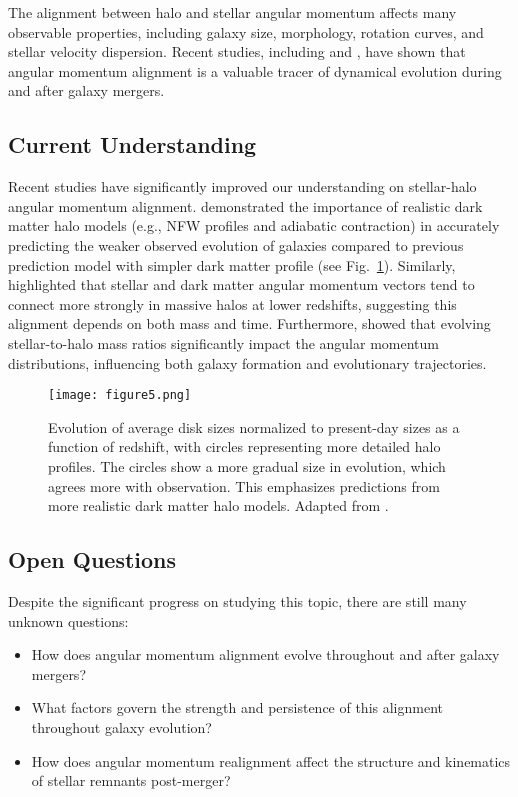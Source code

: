 \documentclass[twocolumn]{aastex631}
\begin{document}
The alignment between halo and stellar angular momentum affects many observable properties, including galaxy size, morphology, rotation curves, and stellar velocity dispersion. Recent studies, including \citet{Chua2019} and \citet{Baptista2023}, have shown that angular momentum alignment is a valuable tracer of dynamical evolution during and after galaxy mergers.

\subsection{Current Understanding}
Recent studies have significantly improved our understanding on stellar-halo angular momentum alignment. \cite{Somerville2008} demonstrated the importance of realistic dark matter halo models (e.g., NFW profiles and adiabatic contraction) in accurately predicting the weaker observed evolution of galaxies compared to previous prediction model with simpler dark matter profile (see Fig.~\ref{fig:somerville_fig5}). Similarly, \cite{Chua2019} highlighted that stellar and dark matter angular momentum vectors tend to connect more strongly in massive halos at lower redshifts, suggesting this alignment depends on both mass and time. Furthermore, \cite{Baptista2023} showed that evolving stellar-to-halo mass ratios significantly impact the angular momentum distributions, influencing both galaxy formation and evolutionary trajectories.

\begin{figure}[H]
    \centering
    \texttt{[image: figure5.png]}
    \caption{Evolution of average disk sizes normalized to present-day sizes as a function of redshift, with circles representing more detailed halo profiles. The circles show a more gradual size in evolution, which agrees more with observation. This emphasizes predictions from more realistic dark matter halo models. Adapted from \citet{Somerville2008}.}
    \label{fig:somerville_fig5}
\end{figure}


\subsection{Open Questions}
Despite the significant progress on studying this topic, there are still many unknown questions:
\begin{itemize}
    \item How does angular momentum alignment evolve throughout and after galaxy mergers?
    \item What factors govern the strength and persistence of this alignment throughout galaxy evolution?
    \item How does angular momentum realignment affect the structure and kinematics of stellar remnants post-merger?
\end{itemize}
\end{document}
